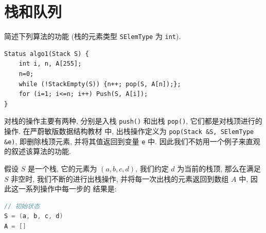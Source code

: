 \documentclass[10pt,UTF8]{book} %
\begin{document}
\chapter{栈和队列}

\begin{exercise}
    简述下列算法的功能 (栈的元素类型 \lstinline|SElemType| 为 \lstinline|int|).
    \begin{lstlisting}
Status algo1(Stack S) {
    int i, n, A[255];
    n=0;
    while (!StackEmpty(S)) {n++; pop(S, A[n]);};
    for (i=1; i<=n; i++) Push(S, A[i]);
}
    \end{lstlisting}
    \begin{cmt}
        对栈的操作主要有两种, 分别是入栈 \lstinline|push()|
        和出栈 \lstinline|pop()|, 它们都是对栈顶进行的操作.
        在严蔚敏版数据结构教材 \cite{严蔚敏}
        中, 出栈操作定义为 \lstinline|pop(Stack &S, SElemType &e)|,
        即删除栈顶元素, 并将其值返回到变量 \lstinline|e| 中.
        因此我们不妨用一个例子来直观的叙述该算法的功能.

        假设 $S$ 是一个栈, 它的元素为 $(a, b, c, d)$, 我们约定 $d$ 
        为当前的栈顶, 那么在满足 $S$ 非空时, 我们不断的进行出栈操作,
        并将每一次出栈的元素返回到数组 $A$ 中, 因此这一系列操作中每一步的
        结果是:
        \begin{lstlisting}[language=C]
// 初始状态
S = (a, b, c, d)
A = []


\end{lstlisting}
\end{cmt}
\end{exercise}
\end{document}
